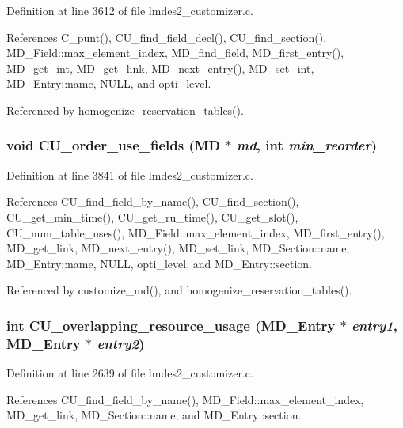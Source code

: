 Definition at line 3612 of file lmdes2\_\-customizer.c.

References C\_\-punt(), CU\_\-find\_\-field\_\-decl(), CU\_\-find\_\-section(), MD\_\-Field::max\_\-element\_\-index, MD\_\-find\_\-field, MD\_\-first\_\-entry(), MD\_\-get\_\-int, MD\_\-get\_\-link, MD\_\-next\_\-entry(), MD\_\-set\_\-int, MD\_\-Entry::name, NULL, and opti\_\-level.

Referenced by homogenize\_\-reservation\_\-tables().
\subsubsection{\setlength{\rightskip}{0pt plus 5cm}void CU\_\-order\_\-use\_\-fields (\bf{MD} $\ast$ {\em md}, int {\em min\_\-reorder})}\label{lmdes2__customizer_8c_09e11110f5b6a98ed4d840057dc1e125}




Definition at line 3841 of file lmdes2\_\-customizer.c.

References CU\_\-find\_\-field\_\-by\_\-name(), CU\_\-find\_\-section(), CU\_\-get\_\-min\_\-time(), CU\_\-get\_\-ru\_\-time(), CU\_\-get\_\-slot(), CU\_\-num\_\-table\_\-uses(), MD\_\-Field::max\_\-element\_\-index, MD\_\-first\_\-entry(), MD\_\-get\_\-link, MD\_\-next\_\-entry(), MD\_\-set\_\-link, MD\_\-Section::name, MD\_\-Entry::name, NULL, opti\_\-level, and MD\_\-Entry::section.

Referenced by customize\_\-md(), and homogenize\_\-reservation\_\-tables().
\subsubsection{\setlength{\rightskip}{0pt plus 5cm}int CU\_\-overlapping\_\-resource\_\-usage (\bf{MD\_\-Entry} $\ast$ {\em entry1}, \bf{MD\_\-Entry} $\ast$ {\em entry2})}\label{lmdes2__customizer_8c_409c425142d1a29b7cd608ce586bb35a}




Definition at line 2639 of file lmdes2\_\-customizer.c.

References CU\_\-find\_\-field\_\-by\_\-name(), MD\_\-Field::max\_\-element\_\-index, MD\_\-get\_\-link, MD\_\-Section::name, and MD\_\-Entry::section.

